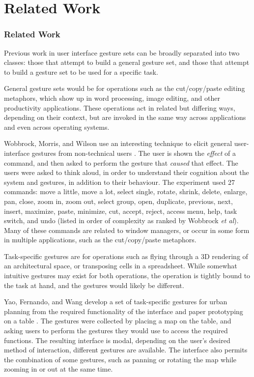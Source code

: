 \chapter{Related Work}

\subsection{Related Work}

Previous work in user interface gesture sets can be broadly separated into two classes: those that attempt to build a general gesture set, and those that attempt to build a gesture set to be used for a specific task. 

General gesture sets would be for operations such as the cut/copy/paste editing metaphors, which show up in word processing, image editing, and other productivity applications. 
These operations act in related but differing ways, depending on their context, but are invoked in the same way across applications and even across operating systems. 

Wobbrock, Morris, and Wilson use an interesting technique to elicit general user-interface gestures from non-technical users \citep{wobbrock2009user}.
The user is shown the \textit{effect} of a command, and then asked to perform the gesture that \textit{caused} that effect. 
The users were asked to think aloud, in order to understand their cognition about the system and gestures, in addition to their behaviour. 
The experiment used 27 commands: move a little, move a lot, select single, rotate, shrink, delete, enlarge, pan, close, zoom in, zoom out, select group, open, duplicate, previous, next, insert, maximize, paste, minimize, cut, accept, reject, access menu, help, task switch, and undo (listed in order of complexity as ranked by Wobbrock \textit{et al}).
Many of these commands are related to window managers, or occur in some form in multiple applications, such as the cut/copy/paste metaphors.

Task-specific gestures are for operations such as flying through a 3D rendering of an architectural space, or transposing cells in a spreadsheet. 
While somewhat intuitive gestures may exist for both operations, the operation is tightly bound to the task at hand, and the gestures would likely be different. 

Yao, Fernando, and Wang develop a set of task-specific gestures for urban planning from the required functionality of the interface and paper prototyping on a table \citep{yao2012multi}. 
The gestures were collected by placing a map on the table, and asking users to perform the gestures they would use to access the required functions. 
The resulting interface is modal, depending on the user's desired method of interaction, different gestures are available. 
The interface also permits the combination of some gestures, such as panning or rotating the map while zooming in or out at the same time. 

